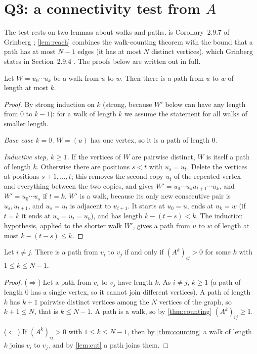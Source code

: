 \section{Q3: a connectivity test from \texorpdfstring{$A$}{A}}\label{sec:test}

The test rests on two lemmas about walks and paths.  is Corollary~2.9.7 of Grinberg \cite[p.~39]{grinberg2025graph}; \cref{lem:reach} combines the walk-counting theorem with the bound that a path has at most $N-1$ edges (it has at most $N$ distinct vertices), which Grinberg states in Section~2.9.4 \cite[p.~40]{grinberg2025graph}. The proofs below are written out in full.

\begin{lemma}\label{lem:cut}
Let $W=u_0\cdots u_k$ be a walk from $u$ to $w$. Then there is a path from $u$ to $w$ of length at most $k$.
\end{lemma}
\begin{proof}
By strong induction on $k$ (strong, because $W'$ below can have any length from $0$ to $k-1$): for a walk of length $k$ we assume the statement for all walks of smaller length.

\emph{Base case $k=0$.} $W=(u)$ has one vertex, so it is a path of length $0$.

\emph{Inductive step, $k\ge1$.} If the vertices of $W$ are pairwise distinct, $W$ is itself a path of length $k$. Otherwise there are positions $s<t$ with $u_s=u_t$. Delete the vertices at positions $s+1,\dots,t$; this removes the second copy $u_t$ of the repeated vertex and everything between the two copies, and gives $W'=u_0\cdots u_su_{t+1}\cdots u_k$, and $W'=u_0\cdots u_s$ if $t=k$. $W'$ is a walk, because its only new consecutive pair is $u_s,u_{t+1}$, and $u_s=u_t$ is adjacent to $u_{t+1}$. It starts at $u_0=u$, ends at $u_k=w$ (if $t=k$ it ends at $u_s=u_t=u_k$), and has length $k-(t-s)<k$. The induction hypothesis, applied to the shorter walk $W'$, gives a path from $u$ to $w$ of length at most $k-(t-s)\le k$.
\end{proof}

\begin{lemma}\label{lem:reach}
Let $i\ne j$. There is a path from $v_i$ to $v_j$ if and only if $(A^k)_{ij}>0$ for some $k$ with $1\le k\le N-1$.
\end{lemma}
\begin{proof}
($\Rightarrow$) Let a path from $v_i$ to $v_j$ have length $k$. As $i\ne j$, $k\ge1$ (a path of length $0$ has a single vertex, so it cannot join different vertices). A path of length $k$ has $k+1$ pairwise distinct vertices among the $N$ vertices of the graph, so $k+1\le N$, that is $k\le N-1$. A path is a walk, so by \cref{thm:counting} $(A^k)_{ij}\ge1$.

($\Leftarrow$) If $(A^k)_{ij}>0$ with $1\le k\le N-1$, then by \cref{thm:counting} a walk of length $k$ joins $v_i$ to $v_j$, and by \cref{lem:cut} a path joins them.
\end{proof}

